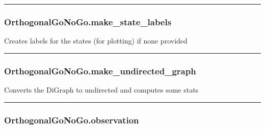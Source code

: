 \begin{center}\rule{0.5\linewidth}{\linethickness}\end{center}

\subsubsection{OrthogonalGoNoGo.make\_state\_labels}\label{orthogonalgonogo.make_state_labels}

\begin{Shaded}
\begin{Highlighting}[]
\NormalTok{)}
\end{Highlighting}
\end{Shaded}

Creates labels for the states (for plotting) if none provided

\begin{center}\rule{0.5\linewidth}{\linethickness}\end{center}

\subsubsection{OrthogonalGoNoGo.make\_undirected\_graph}\label{orthogonalgonogo.make_undirected_graph}

\begin{Shaded}
\begin{Highlighting}[]
\NormalTok{)}
\end{Highlighting}
\end{Shaded}

Converts the DiGraph to undirected and computes some stats

\begin{center}\rule{0.5\linewidth}{\linethickness}\end{center}

\subsubsection{OrthogonalGoNoGo.observation}\label{orthogonalgonogo.observation}

\begin{Shaded}
\begin{Highlighting}[]
\NormalTok{)}
\end{Highlighting}
\end{Shaded}

